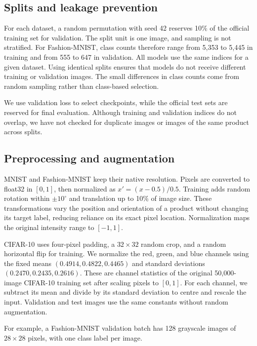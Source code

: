 \clearpage
\subsection{Splits and leakage prevention}
\label{sec:splits}
For each dataset, a random permutation with seed 42 reserves 10\% of the official
training set for validation. The split unit is one image, and sampling is not
stratified. For Fashion-MNIST, class counts therefore range from 5,353 to 5,445
in training and from 555 to 647 in validation. All models use the same indices
for a given dataset. Using identical splits ensures that models do not receive different training
or validation images. The small differences in class counts come from random
sampling rather than class-based selection.

We use validation loss to select checkpoints, while the official test sets are
reserved for final evaluation. Although training and validation indices do not
overlap, we have not checked for duplicate images or images of the same product
across splits.

\subsection{Preprocessing and augmentation}
\label{sec:preprocessing}
MNIST and Fashion-MNIST keep their native resolution. Pixels are converted to
float32 in $[0,1]$, then normalized as $x'=(x-0.5)/0.5$. Training adds random
rotation within $\pm10^\circ$ and translation up to 10\% of image size. These transformations vary the position and orientation of a product without
changing its target label, reducing reliance on its exact pixel location.
Normalization maps the original intensity range to $[-1,1]$.

CIFAR-10 uses four-pixel padding, a $32\times32$ random crop, and a random
horizontal flip for training. We normalize the red, green, and blue channels using the fixed means
$(0.4914,0.4822,0.4465)$ and standard deviations $(0.2470,0.2435,0.2616)$.
These are channel statistics of the original 50,000-image CIFAR-10 training
set after scaling pixels to $[0,1]$. For each channel, we subtract its mean and
divide by its standard deviation to centre and rescale the input. Validation
and test images use the same constants without random augmentation.

For example, a Fashion-MNIST validation batch has 128 grayscale images of
$28\times28$ pixels, with one class label per image.
